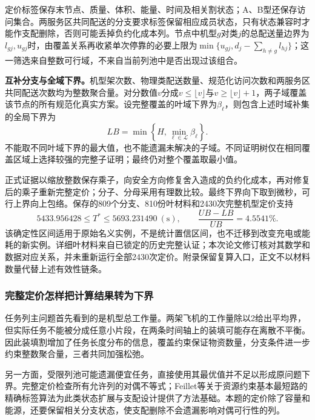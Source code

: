 \documentclass[withoutpreface,colorprint]{format}
\numberwithin{equation}{section}
\numberwithin{figure}{section}
\numberwithin{table}{section}
\begin{document}
定价标签保存末节点、质量、体积、能量、时间及相关割状态；A、B型还保存访问集合。两服务区共同配送的分支要求标签保留相应成员状态，只有状态兼容时才能作支配删除，否则可能丢掉负约化成本列。节点中机型$g$对类$j$的总配送量边界为$l_{gj},u_{gj}$时，由覆盖关系再收紧单次停靠的必要上限为$\min\{u_{gj},d_j-\sum_{h\ne g}l_{hj}\}$；这一筛选来自整数可行域，不来自当前列池中是否出现过该组合。

\textbf{互补分支与全域下界。}机型架次数、物理类配送数量、规范化访问次数和两服务区共同配送次数均为整数聚合量。对分数值$v$分成$v\le\lfloor v\rfloor$与$v\ge\lfloor v\rfloor+1$，两子域覆盖该节点的所有规范化真实方案。设完整覆盖的叶域下界为$\beta_\ell$，则包含上述时域补集的全局下界为
\begin{equation}
 LB=\min\left\{H,\min_{\ell\in\mathcal L}\beta_\ell\right\}.
 \label{eq:q2_cover_bound}
\end{equation}
不能取不同叶域下界的最大值，也不能遗漏未解决的子域。不同证明树仅在相同覆盖区域上选择较强的完整子证明；最终仍对整个覆盖取最小值。

正式证据以缩放整数保存乘子，向安全方向修复舍入造成的负约化成本，再对修复后的乘子重新完整定价；分子、分母采用有理数比较。最终下界向下取到微秒，可行上界向上包络。保存的809个分支、810份叶材料和2430次完整机型定价支持
\begin{equation}
 5433.956428\le T^*\le5693.231490\ \mathrm{(s)},\qquad
 \frac{UB-LB}{UB}=4.5541\%.
 \label{eq:q2_bound}
\end{equation}
该确定性区间适用于原始名义实例，不是统计置信区间，也不迁移到改变充电或能耗的新实例。详细叶材料来自已锁定的历史完整认证；本次论文修订核对其数学和数据对应关系，并未重新运行全部2430次定价。附录保留复算入口，正文不以材料数量代替上述有效性链条。



\subsubsection{完整定价怎样把计算结果转为下界}
任务列主问题首先看到的是机型总工作量。两架飞机的工作量除以2给出平均界，但实际任务不能被分成任意小片段，在两条时间轴上的装填可能存在离散不平衡。因此装填割增加了任务长度分布的信息，覆盖约束保证物资数量，分支条件进一步约束整数聚合量，三者共同加强松弛。

另一方面，受限列池可能遗漏便宜任务，直接使用其最优值并不足以形成原问题下界。完整定价检查所有允许列的对偶不等式；Feillet等关于资源约束基本最短路的精确标签算法为此类状态扩展与支配设计提供了方法基础\cite{feillet2004}。本题的定价除了容量和能源，还要保留相关分支状态，使支配删除不会遗漏影响对偶可行性的列。
\end{document}
